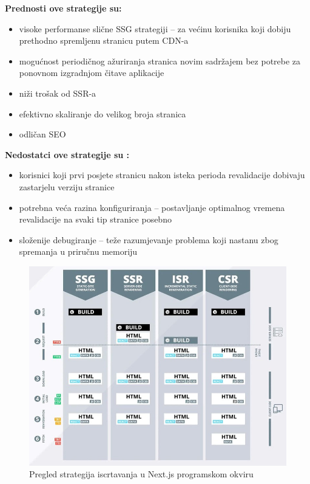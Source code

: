 \bigskip

\textbf{Prednosti ove strategije su:}
\begin{itemize}
    \item visoke performanse slične SSG strategiji – za većinu korisnika koji dobiju prethodno spremljenu stranicu putem CDN-a
    \item mogućnost periodičnog ažuriranja stranica novim sadržajem bez potrebe za ponovnom izgradnjom čitave aplikacije
    \item niži trošak od SSR-a
    \item efektivno skaliranje do velikog broja stranica
    \item odličan SEO
\end{itemize}

\bigskip

\textbf{Nedostatci ove strategije su \cite{flaws2021isr}:}

\begin{itemize}
    \item korisnici koji prvi posjete stranicu nakon isteka perioda revalidacije dobivaju zastarjelu verziju stranice
    \item potrebna veća razina konfiguriranja – postavljanje optimalnog vremena revalidacije na svaki tip stranice posebno
    \item složenije debugiranje – teže razumjevanje problema koji nastanu zbog spremanja u priručnu memoriju
\end{itemize}


\begin{figure}[H]
    \centering
    \includegraphics[width=\textwidth]{slike/uvod/pregled-strategija-iscrtavanja.jpg}
    \caption{Pregled strategija iscrtavanja u Next.js programskom okviru \cite{dumais2021nextjs}}
    \label{fig:pregled-strategija-iscrtavanja}
\end{figure}


